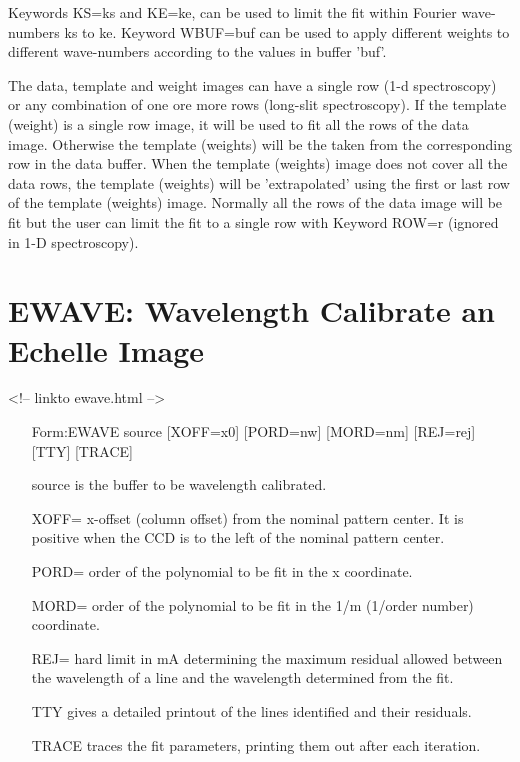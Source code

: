 Keywords KS=ks and KE=ke, can be used to limit the fit within Fourier
wave-numbers ks to ke. Keyword WBUF=buf can be used to apply different
weights to different wave-numbers according to the values in buffer 'buf'.

The data, template and weight images can have a single row (1-d
spectroscopy) or any combination of one ore more rows (long-slit
spectroscopy). If the template (weight) is a single row image, it will be
used to fit all the rows of the data image. Otherwise the template
(weights) will be the taken from the corresponding row in the data
buffer. When the template (weights) image does not cover all the data rows,
the template (weights) will be 'extrapolated' using the first or last row
of the template (weights) image. Normally all the rows of the data image
will be fit but the user can limit the fit to a single row with Keyword
ROW=r (ignored in 1-D spectroscopy).

\section{EWAVE: Wavelength Calibrate an Echelle Image}
\begin{rawhtml}
<!-- linkto ewave.html -->
\end{rawhtml}
\begin{itemize}
  \item[Form:EWAVE source {[XOFF=x0]} {[PORD=nw]} {[MORD=nm]} {[REJ=rej]} 
       {[TTY]} {[TRACE]} \hfill]{}
  \item[source]{is the buffer to be wavelength calibrated.}
  \item[XOFF=]{x-offset (column offset) from the nominal 
       pattern center. It is positive when the CCD
       is to the left of the nominal pattern center.}
  \item[PORD=]{order of the polynomial to be fit in the x coordinate.}
  \item[MORD=]{order of the polynomial to be fit in the 1/m
       (1/order number) coordinate.}
  \item[REJ=]{hard limit in mA determining the maximum residual
       allowed between the wavelength of a line and the
       wavelength determined from the fit.}
  \item[TTY]{gives a detailed printout of the lines identified and 
       their residuals.}
  \item[TRACE]{traces the fit parameters, printing them out after each 
       iteration.}
\end{itemize}

